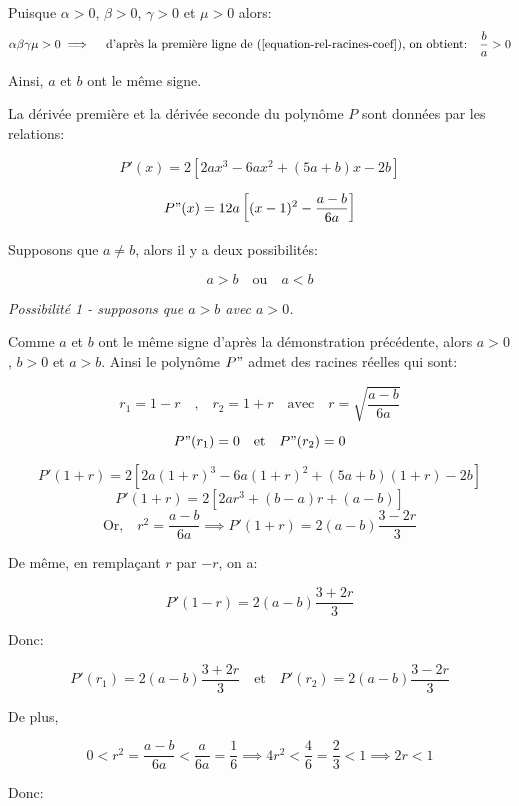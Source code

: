 \documentclass[12pt,a4paper,article]{memoir}
\begin{document}
Puisque $\alpha > 0$, $\beta > 0$, $\gamma > 0$ et $\mu > 0$ alors:
\[\alpha\beta\gamma\mu > 0 \implies \quad \textrm{d'après la première ligne de (\ref{equation-rel-racines-coef}), on obtient:}  \quad \frac{b}{a} > 0\]

Ainsi, $a$ et $b$ ont le même signe.

\bigskip

La dérivée première et la dérivée seconde du polynôme $P$ sont données par les relations:

\begin{equation}
P'(x) = 2[2ax^3 - 6ax^2+(5a+b)x-2b]
\label{equation-pb-5-pderpre}
\end{equation}

\begin{equation}
P"(x) = 12a\left[(x-1)^2 - \frac{a-b}{6a}\right]
\label{equation-pb-5-pdersec}
\end{equation}

\bigskip

Supposons que $a \neq b$, alors il y a deux possibilités: 

\[a > b \quad \textrm{ou} \quad a < b\]

\textit{Possibilité 1 - supposons que $a > b$ avec $a > 0$.}

\bigskip

Comme $a$ et $b$ ont le même signe d'après la démonstration précédente, alors $a > 0$, $b > 0$ et $a > b$. Ainsi le polynôme $P"$ admet des racines réelles qui sont:

\[r_{1} = 1 - r \quad \textrm{,} \quad r_{2} = 1 + r \quad \textrm{avec} \quad r = \sqrt{\frac{a-b}{6a}}\]

\[P"(r_{1}) = 0 \quad \textrm{et} \quad P"(r_{2}) = 0\]

\[P'(1 + r) =  2[2a(1+ r)^3 - 6a(1+ r)^2+(5a+b)(1+ r)-2b] \]
\[P'(1 + r) = 2[2ar^3 + (b-a)r + (a-b)]\]
\[\textrm{Or,} \quad r^2 = \frac{a-b}{6a} \implies P'(1+ r) = 2(a-b)\frac{3 - 2r}{3}\]

De même, en remplaçant $r$ par $-r$, on a:

\[P'(1- r) = 2(a-b)\frac{3 + 2r}{3}\]

Donc:

\[P'(r_{1}) = 2(a-b)\frac{3 + 2r}{3} \quad \textrm{et} \quad P'(r_{2}) = 2(a-b)\frac{3 - 2r}{3}\]

De plus,

\[0 < r^2 = \frac{a-b}{6a} <  \frac{a}{6a} = \frac{1}{6} \implies 4r^2 < \frac{4}{6} = \frac{2}{3} < 1 \implies 2r < 1\]

Donc:
\end{document}
